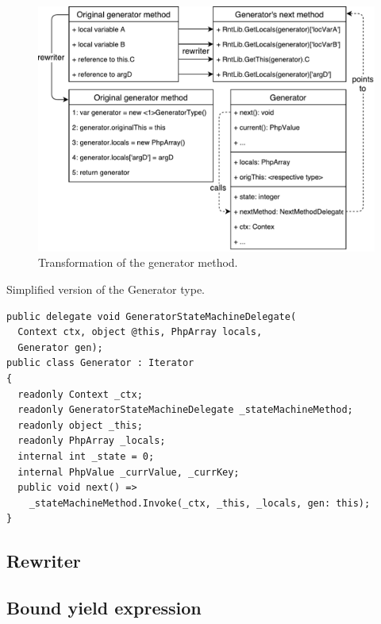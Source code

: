\begin{figure}[h]
	\centering	
	\includegraphics[scale=0.70]{../img/5_1_Generator}	
	\caption{Transformation of the generator method.}
	\label{fig5.1:Generator}
\end{figure}

\begin{listing}[H]
\caption{Simplified version of the Generator type.}
\label{list5.1:GeneratorType}
\begin{verbatim}
public delegate void GeneratorStateMachineDelegate(
  Context ctx, object @this, PhpArray locals, 
  Generator gen);
public class Generator : Iterator
{
  readonly Context _ctx;
  readonly GeneratorStateMachineDelegate _stateMachineMethod;
  readonly object _this;
  readonly PhpArray _locals;
  internal int _state = 0;
  internal PhpValue _currValue, _currKey;
  public void next() =>
    _stateMachineMethod.Invoke(_ctx, _this, _locals, gen: this);
}
\end{verbatim}
\end{listing}


\subsection{Rewriter}

\subsection{Bound yield expression}

